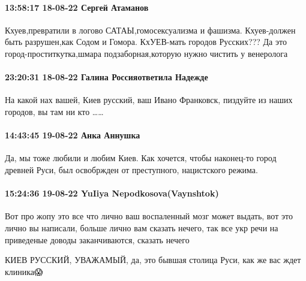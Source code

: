 \paragraph{13:58:17 18-08-22 Сергей Атаманов}

Кхуев,превратили в логово САТАЫ,гомосексуализма и фашизма. Кхуев-должен быть
разрушен,как Содом и Гомора.  КхУЕВ-мать городов Русских??? Да это
город-проститкутка,шмара подзаборная,которую нужно чистить у венеролога

\paragraph{23:20:31 18-08-22 Галина Россияответила Надежде}

На какой нах вашей, Киев русский, ваш Ивано Франковск, пиздуйте из наших
городов, вы там ни кто ……

\paragraph{14:43:45 19-08-22 Анка Аннушка}

Да, мы тоже любили и любим Киев. Как хочется, чтобы наконец-то город древней
Руси, был освобржден от преступного, нацистского режима.

\paragraph{15:24:36 19-08-22 YuIiya Nepodkosova(Vaynshtok)}

Вот про жопу это все что лично ваш воспаленный мозг может выдать, вот это лично
вы написали, больше лично вам сказать нечего, так все укр речи на приведеные
доводы заканчиваются, сказать нечего

КИЕВ РУССКИЙ, УВАЖАМЫЙ, да, это бывшая столица Руси, как же вас ждет клиника😱
